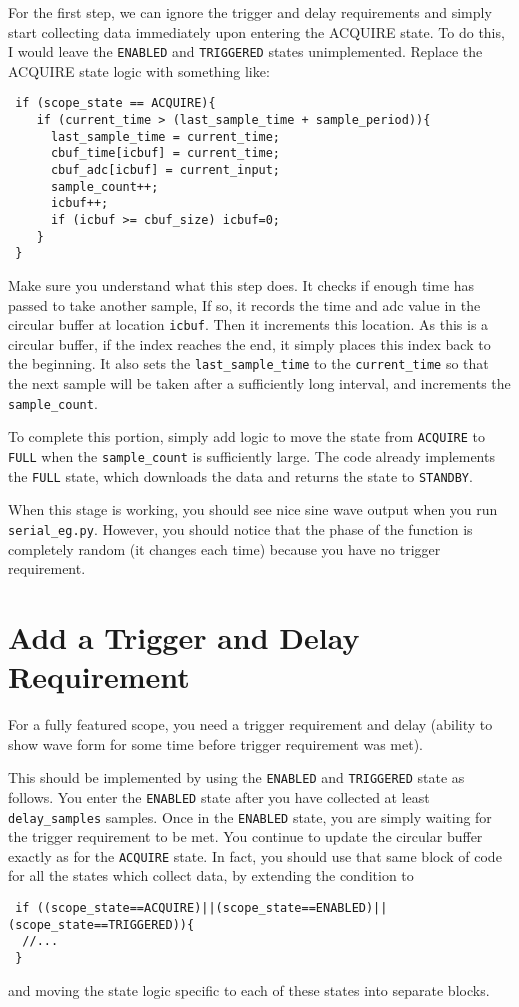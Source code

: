 \documentclass[12pt]{article}
\begin{document}
For the first step, we can ignore the trigger and delay requirements and simply start collecting data immediately upon entering the ACQUIRE state.  To do this, I would leave the {\tt ENABLED} and {\tt TRIGGERED} states unimplemented.  
Replace the ACQUIRE state logic with something like:
\begin{verbatim}
 if (scope_state == ACQUIRE){
    if (current_time > (last_sample_time + sample_period)){
      last_sample_time = current_time;
      cbuf_time[icbuf] = current_time;
      cbuf_adc[icbuf] = current_input;      
      sample_count++;
      icbuf++;
      if (icbuf >= cbuf_size) icbuf=0;
    }
 }
 \end{verbatim}
Make sure you understand what this step does.  It checks if enough time has passed to take another sample,  If so, it records the time and adc value in the circular buffer at location {\tt icbuf}.  Then it increments this location.  As this is a circular buffer, if the index reaches the end, it simply places this index back to the beginning.  It also sets the {\tt last\_sample\_time} to the {\tt current\_time} so that the next sample will be taken after a sufficiently long interval, and increments the {\tt sample\_count}.

To complete this portion, simply add logic to move the state from {\tt ACQUIRE} to {\tt FULL} when the {\tt sample\_count} is sufficiently large.  The code already implements the {\tt FULL} state, which downloads the data and returns the state to {\tt STANDBY}.

When this stage is working, you should see nice sine wave output when you run {\tt serial\_eg.py}.  However, you should notice that the phase of the function is completely random (it changes each time) because you have no trigger requirement.

\section{Add a Trigger and Delay Requirement}

For a fully featured scope, you need a trigger requirement and delay (ability to show wave form for some time before trigger requirement was met).

This should be implemented by using the {\tt ENABLED} and {\tt TRIGGERED} state as follows.  You enter the {\tt ENABLED} state after you have collected at least {\tt delay\_samples} samples.  Once in the {\tt ENABLED} state, you are simply waiting for the trigger requirement to be met.  You continue to update the circular buffer exactly as for the {\tt ACQUIRE} state.  In fact, you should use that same block of code for all the states which collect data, by extending the condition to 
\begin{verbatim}
 if ((scope_state==ACQUIRE)||(scope_state==ENABLED)||(scope_state==TRIGGERED)){
  //...
 }
\end{verbatim}
and moving the state logic specific to each of these states into separate blocks.
\end{document}
